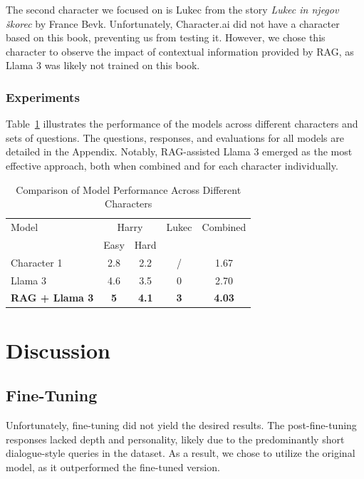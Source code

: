 \documentclass[fleqn,moreauthors,10pt]{ds_report}
\begin{document}
The second character we focused on is Lukec from the story \textit{Lukec in njegov škorec} by France Bevk. Unfortunately, Character.ai did not have a character based on this book, preventing us from testing it. However, we chose this character to observe the impact of contextual information provided by RAG, as Llama 3 was likely not trained on this book.

\subsubsection*{Experiments}

Table~\ref{tab:result} illustrates the performance of the models across different characters and sets of questions. The questions, responses, and evaluations for all models are detailed in the Appendix. Notably, RAG-assisted Llama 3 emerged as the most effective approach, both when combined and for each character individually.

\begin{table}[hbt]
	\caption{Comparison of Model Performance Across Different Characters}
	\centering
	\begin{tabular}{l | c c c c}
		\toprule
		Model & \multicolumn{2}{c}{Harry} & Lukec & Combined \\
		\cmidrule(lr){2-3}
		& Easy & Hard & & \\
		\midrule
		Character 1   & 2.8 & 2.2 & / & 1.67   \\
		Llama 3       & 4.6 & 3.5 & 0 & 2.70   \\
            \textbf{RAG + Llama 3} & \textbf{5} & \textbf{4.1} & \textbf{3} & \textbf{4.03} \\
		\bottomrule
	\end{tabular}
	\label{tab:result}
\end{table}


\section*{Discussion}

\subsection*{Fine-Tuning}

Unfortunately, fine-tuning did not yield the desired results. The post-fine-tuning responses lacked depth and personality, likely due to the predominantly short dialogue-style queries in the dataset. As a result, we chose to utilize the original model, as it outperformed the fine-tuned version.
    
\end{document}

